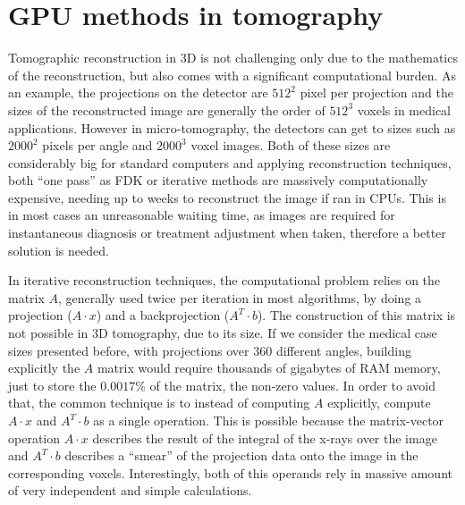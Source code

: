 
\chapter{GPU methods in tomography}

Tomographic reconstruction in 3D is not challenging only due to the mathematics of the reconstruction, but also comes with a significant computational burden. As an example, the projections on the detector are $512^2$ pixel per projection and the sizes of the reconstructed image are generally the order of $512^3$ voxels in medical applications. However in micro-tomography, the detectors can get to sizes such as $2000^2$ pixels per angle and $2000^3$ voxel images. Both of these sizes are considerably big for standard computers and applying reconstruction techniques, both ``one pass'' as FDK or iterative methods are massively computationally expensive, needing up to weeks to reconstruct the image if ran in CPUs. This is in most cases an unreasonable waiting time, as images are required for instantaneous diagnosis or treatment adjustment when taken, therefore a better solution is needed.

In iterative reconstruction techniques, the computational problem relies on the matrix $A$, generally used twice per iteration in most algorithms, by doing a projection ($A\cdot x$) and a backprojection ($A^T\cdot b$). The construction of this matrix is not possible in 3D tomography, due to its size. If we consider the medical case sizes presented before, with projections over 360 different angles, building explicitly the $A$ matrix would require thousands of gigabytes of  RAM memory, just to store the $0.0017\%$ of the matrix, the non-zero values. In order to avoid that, the common technique is to instead of computing $A$ explicitly, compute $A\cdot x$ and $A^T\cdot b$ as a single operation. This is possible because the matrix-vector operation $A\cdot x$ describes the result of the integral of the x-rays over the image and $A^T\cdot b$ describes a ``smear'' of the projection data onto the image in the corresponding voxels. Interestingly, both of this operands rely in massive amount of very independent and simple calculations.

